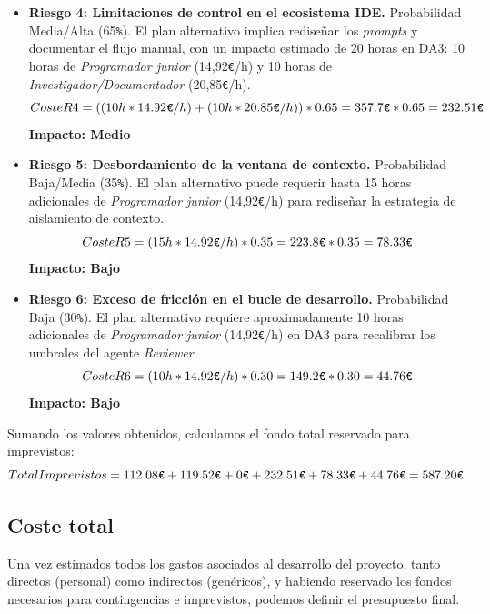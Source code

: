 \documentclass[11pt, letterpaper]{article}
\begin{document}
\begin{itemize}
    \item \textbf{Riesgo 4: Limitaciones de control en el ecosistema IDE.} Probabilidad Media/Alta (65\verb|%|). El plan alternativo implica rediseñar los \textit{prompts} y documentar el flujo manual, con un impacto estimado de 20 horas en DA3: 10 horas de \textit{Programador junior} (14,92\verb|€|/h) y 10 horas de \textit{Investigador/Documentador} (20,85\verb|€|/h).
    \begin{equation*}
        Coste R4 = ((10h * 14{.}92\verb|€|/h) + (10h * 20{.}85\verb|€|/h)) * 0{.}65 = 357{.}7\verb|€| * 0{.}65 = 232{.}51\verb|€|
    \end{equation*}
    \textbf{Impacto: Medio}

    \item \textbf{Riesgo 5: Desbordamiento de la ventana de contexto.} Probabilidad Baja/Media (35\verb|%|). El plan alternativo puede requerir hasta 15 horas adicionales de \textit{Programador junior} (14,92\verb|€|/h) para rediseñar la estrategia de aislamiento de contexto.
    \begin{equation*}
        Coste R5 = (15h * 14{.}92\verb|€|/h) * 0{.}35 = 223{.}8\verb|€| * 0{.}35 = 78{.}33\verb|€|
    \end{equation*}
    \textbf{Impacto: Bajo}

    \item \textbf{Riesgo 6: Exceso de fricción en el bucle de desarrollo.} Probabilidad Baja (30\verb|%|). El plan alternativo requiere aproximadamente 10 horas adicionales de \textit{Programador junior} (14,92\verb|€|/h) en DA3 para recalibrar los umbrales del agente \textit{Reviewer}.
    \begin{equation*}
        Coste R6 = (10h * 14{.}92\verb|€|/h) * 0{.}30 = 149{.}2\verb|€| * 0{.}30 = 44{.}76\verb|€|
    \end{equation*}
    \textbf{Impacto: Bajo}
\end{itemize}

Sumando los valores obtenidos, calculamos el fondo total reservado para imprevistos:
\begin{equation}
    Total Imprevistos = 112{.}08\verb|€| + 119{.}52\verb|€| + 0\verb|€| + 232{.}51\verb|€| + 78{.}33\verb|€| + 44{.}76\verb|€| = 587{.}20\verb|€|
\end{equation}

\subsection{Coste total}
Una vez estimados todos los gastos asociados al desarrollo del proyecto, tanto directos (personal) como indirectos (genéricos), y habiendo reservado los fondos necesarios para contingencias e imprevistos, podemos definir el presupuesto final. 
\end{document}
